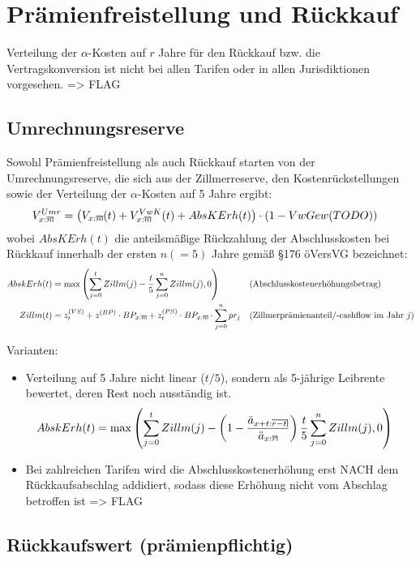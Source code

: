 \documentclass[a4paper,10pt]{article}
\makeatletter
\newcommand{\xn}{{\act[x]{n}}}
\DeclareRobustCommand{\act}[2][]{%
\def\arraystretch{0}%
\setlength\arraycolsep{0.5pt}%
\setlength\arrayrulewidth{0.5pt}%
\setbox0=\hbox{$\scriptstyle#1\ifx#1\empty{asdf}\else:\fi#2$}%
\begin{array}[b]{*2{@{}>{\scriptstyle}c}|}
\cline{2-2}%
\rule[1.25pt]{0pt}{\ht0}%
#1\ifx#1\empty\else:\fi & #2%
\end{array}%
}
\makeatother
\begin{document}
\pagebreak

\section{Prämienfreistellung und Rückkauf}

Verteilung der $\alpha$-Kosten auf $r$ Jahre für den Rückkauf bzw. die Vertragskonversion 
ist nicht bei allen Tarifen oder in allen Jurisdiktionen vorgesehen. => FLAG

\subsection{Umrechnungsreserve}
Sowohl Prämienfreistellung als auch Rückkauf starten von der Umrechnungsreserve, die sich aus der 
Zillmerreserve, den Kostenrückstellungen sowie der Verteilung der $\alpha$-Kosten auf 5 Jahre ergibt:
\begin{align*}
 V_\xn^{Umr} &= \left(V_\xn(t) + V^{VwK}_\xn(t) + AbsKErh(t)\right)\cdot (1-VwGew(TODO))
\end{align*}
wobei $AbsKErh(t)$ die anteilsmäßige Rückzahlung der Abschlusskosten bei Rückkauf innerhalb der ersten 
$n(=5)$ Jahre gemäß \S 176 öVersVG bezeichnet:
\begin{align*}
AbskErh(t) &= \max\left(\sum_{j=0}^t Zillm(j) - \frac{t}{5} \sum_{j=0}^n Zillm(j), 0\right)&& \text{(Abschlusskostenerhöhungsbetrag)}\\
Zillm(t) &= z^{(VS)}_t + z^{(BP)} \cdot BP_\xn + z^{(PS)}_t \cdot BP_\xn \cdot \sum_{j=0}^n pr_j &&\text{(Zillmerprämienanteil/-cashflow im Jahr $j$)}
\end{align*}

Varianten:
\begin{itemize}
 \item Verteilung auf 5 Jahre nicht linear ($t/5$), sondern als 5-jährige Leibrente bewertet, deren Rest noch ausständig ist.
 \begin{align*}
   AbskErh(t) &= \max\left(\sum_{j=0}^t Zillm(j) - \left(1-\frac{\ddot{a}_{\act[x+t]{r-t}}}{\ddot{a}_{\act[x]{r}}}\right) \frac{t}{5} \sum_{j=0}^n Zillm(j), 0\right)
 \end{align*}
 \item Bei zahlreichen Tarifen wird die Abschlusskostenerhöhung erst NACH dem Rückkaufsabschlag addidiert, 
    sodass diese Erhöhung nicht vom Abschlag betroffen ist => FLAG
\end{itemize}

\subsection{Rückkaufswert (prämienpflichtig)}
\end{document}
